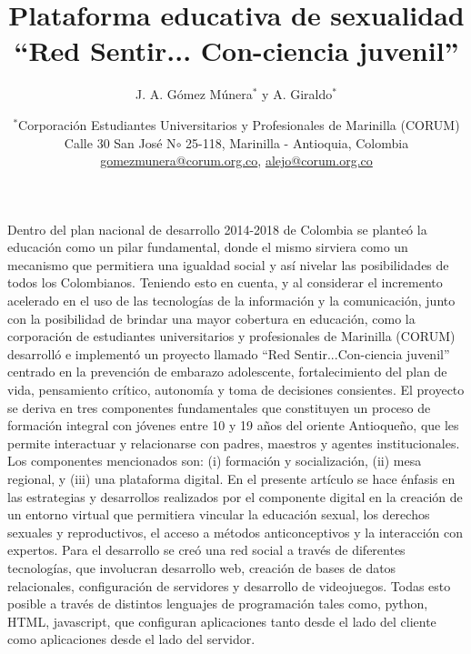 \documentclass[a4paper]{article}
\begin{document}
\title{Plataforma educativa de sexualidad ``Red Sentir... Con-ciencia juvenil''}

\author{J. A. Gómez Múnera$^{\ast }$ y A. Giraldo$^{\ast }$}
\date{$^{\ast }$Corporación Estudiantes Universitarios y Profesionales de Marinilla (CORUM)
\\Calle 30 San José N$\circ$ 25-118, Marinilla - Antioquia, Colombia
\\ \href{mailto:gomezmunera@corum.org.co}{gomezmunera@corum.org.co}, \href{mailto:alejo@corum.org.co}{alejo@corum.org.co}}


\maketitle

\renewcommand{\tablename}{Tabla}
\renewcommand{\refname}{REFERENCIAS}

\abstract Dentro del plan nacional de desarrollo 2014-2018 de Colombia se planteó la educación como un pilar fundamental, donde el mismo sirviera como un mecanismo que permitiera una igualdad social y así nivelar las posibilidades de todos los Colombianos. Teniendo esto en cuenta, y al considerar el incremento acelerado en el uso de las tecnologías de la información y la comunicación, junto con la posibilidad de brindar una mayor cobertura en educación, como la corporación de estudiantes universitarios y profesionales de Marinilla (CORUM) desarrolló e implementó un proyecto llamado ``Red Sentir...Con-ciencia juvenil'' centrado en la prevención de embarazo adolescente, fortalecimiento del plan de vida, pensamiento crítico, autonomía y toma de decisiones consientes. El proyecto se deriva en tres componentes fundamentales que constituyen un proceso de formación integral con jóvenes entre 10 y 19 años del oriente Antioqueño, que les permite interactuar y relacionarse con padres, maestros y agentes institucionales. Los componentes mencionados son: (i) formación y socialización, (ii) mesa regional, y (iii) una plataforma digital. En el presente artículo se hace énfasis en las estrategias y desarrollos realizados por el componente digital en la creación de un entorno virtual que permitiera vincular la educación sexual, los derechos sexuales y reproductivos, el acceso a métodos anticonceptivos y la interacción con expertos. Para el desarrollo se creó una red social a través de diferentes tecnologías, que involucran desarrollo web, creación de bases de datos relacionales, configuración de servidores y desarrollo de videojuegos. Todas esto posible a través de distintos lenguajes de programación tales como, python, HTML, javascript, que configuran aplicaciones tanto desde el lado del cliente como aplicaciones desde el lado del servidor.\endabstract
\end{document}
